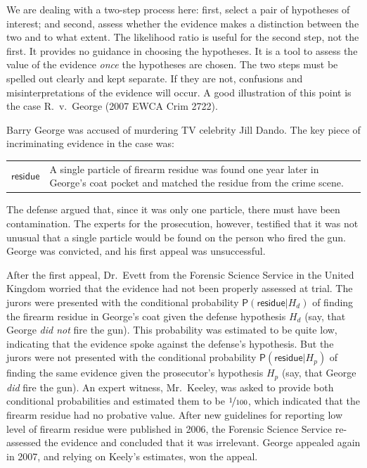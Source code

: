 \documentclass[
  10pt,
  dvipsnames,enabledeprecatedfontcommands]{scrartcl}
\newcommand{\pr}[1]{\mathsf{P}(#1)}
\begin{document}
We are dealing with a two-step process here: first, select a pair of
hypotheses of interest; and second, assess whether the evidence makes a
distinction between the two and to what extent. The likelihood ratio is
useful for the second step, not the first. It provides no guidance in
choosing the hypotheses. It is a tool to assess the value of the
evidence \textit{once} the hypotheses are chosen. The two steps must be
spelled out clearly and kept separate. If they are not, confusions and
misinterpretations of the evidence will occur. A good illustration of
this point is the case R.~v.~George (2007 EWCA Crim 2722).

Barry George was accused of murdering TV celebrity Jill Dando. The key
piece of incriminating evidence in the case was:

\begin{center}
\begin{tabular}{lp{12cm}} 
    $\textsf{residue}$ &  
    A single particle of firearm  residue was found one year later in George's coat pocket and matched the residue from the crime scene. 
\end{tabular}
\end{center}

\noindent  The defense argued that, since it was only one particle,
there must have been contamination. The experts for the prosecution,
however, testified that it was not unusual that a single particle would
be found on the person who fired the gun. George was convicted, and his
first appeal was unsuccessful.

After the first appeal, Dr.~Evett from the Forensic Science Service in
the United Kingdom worried that the evidence had not been properly
assessed at trial. The jurors were presented with the conditional
probability \(\pr{\textsf{residue}\vert H_d}\) of finding the firearm
residue in George's coat given the defense hypothesis \(H_d\) (say, that
George \textit{did not} fire the gun). This probability was estimated to
be quite low, indicating that the evidence spoke against the defense's
hypothesis. But the jurors were not presented with the conditional
probability \(\pr{\textsf{residue}\vert H_p}\) of finding the same
evidence given the prosecutor's hypothesis \(H_p\) (say, that George
\textit{did} fire the gun). An expert witness, Mr.~Keeley, was asked to
provide both conditional probabilities and estimated them to be
\(\nicefrac{1}{100}\), which indicated that the firearm residue had no
probative value. After new guidelines for reporting low level of firearm
residue were published in 2006, the Forensic Science Service re-assessed
the evidence and concluded that it was irrelevant. George appealed again
in 2007, and relying on Keely's estimates, won the appeal.
\end{document}
